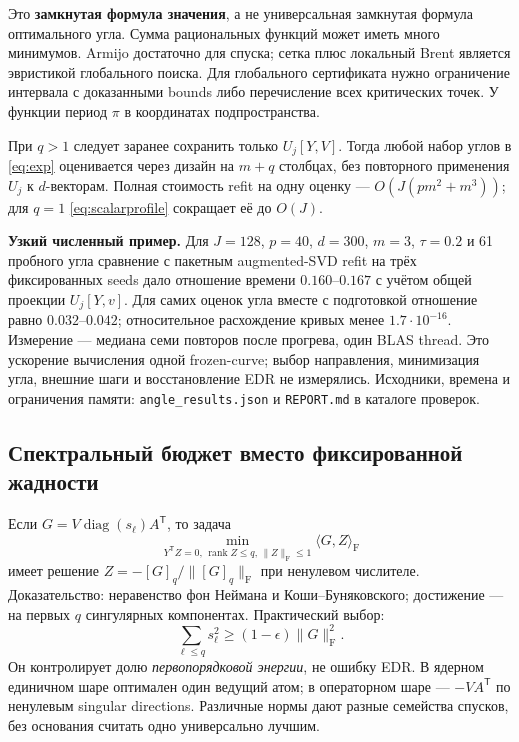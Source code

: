 \documentclass[11pt,a4paper]{article}
\newcommand{\T}{^{\mathsf T}}
\newcommand{\F}{_{\mathrm F}}
\newcommand{\ip}[2]{\langle #1,#2\rangle_{\mathrm F}}
\DeclareMathOperator{\rank}{rank}
\begin{document}
Это \textbf{замкнутая формула значения}, а не универсальная замкнутая
формула оптимального угла. Сумма рациональных функций может иметь много
минимумов. Armijo достаточно для спуска; сетка плюс локальный Brent
является эвристикой глобального поиска. Для глобального сертификата
нужно ограничение интервала с доказанными bounds либо перечисление всех
критических точек. У функции период $\pi$ в координатах подпространства.

При $q>1$ следует заранее сохранить только
$U_j[Y,V]$. Тогда любой набор углов в \eqref{eq:exp} оценивается через
дизайн на $m+q$ столбцах, без повторного применения $U_j$ к $d$-векторам.
Полная стоимость refit на одну оценку --- $O(J(pm^2+m^3))$;
для $q=1$ \eqref{eq:scalarprofile} сокращает её до $O(J)$.

\textbf{Узкий численный пример.} Для $J=128$, $p=40$, $d=300$, $m=3$,
$\tau=0.2$ и 61 пробного угла сравнение с пакетным augmented-SVD refit
на трёх фиксированных seeds дало отношение времени $0.160$--$0.167$
с учётом общей проекции $U_j[Y,v]$. Для самих оценок угла вместе с
подготовкой отношение равно $0.032$--$0.042$;
относительное расхождение кривых менее $1.7\cdot10^{-16}$.
Измерение --- медиана семи повторов после прогрева, один BLAS thread.
Это ускорение вычисления одной frozen-curve; выбор направления,
минимизация угла, внешние шаги и восстановление EDR не измерялись.
Исходники, времена и ограничения памяти: \texttt{angle\_results.json}
и \texttt{REPORT.md} в каталоге проверок.

\subsection{Спектральный бюджет вместо фиксированной жадности}
Если $G=V\operatorname{diag}(s_\ell)A\T$, то задача
\[
 \min_{Y\T Z=0,\,\rank Z\le q,\,\|Z\|\F\le1}\ip{G}{Z}
\]
имеет решение $Z=-[G]_q/\|[G]_q\|\F$ при ненулевом числителе.
Доказательство: неравенство фон Неймана и Коши--Буняковского;
достижение --- на первых $q$ сингулярных компонентах.
Практический выбор:
\begin{equation}\label{eq:energybudget}
 \sum_{\ell\le q}s_\ell^2\ge(1-\epsilon)\|G\|\F^2.
\end{equation}
Он контролирует долю \emph{первопорядковой энергии}, не ошибку EDR.
В ядерном единичном шаре оптимален один ведущий атом; в операторном
шаре --- $-VA\T$ по ненулевым singular directions. Различные нормы
дают разные семейства спусков, без основания считать одно универсально лучшим.
\end{document}
